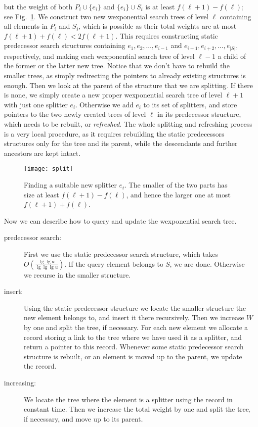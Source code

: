 \documentclass[11pt,onecolumn,final]{article} \usepackage{a4}
\theoremstyle{plain}
\theoremstyle{remark}
\begin{document}
but the weight of both $P_{i}\cup\{e_{i}\}$ and $\{e_{i}\}\cup S_{i}$ is at least $f(\ell+1)-f(\ell)$; see Fig.~\ref{fig:split}. We construct two new wexponential search trees of level $\ell$ containing all elements in $P_{i}$ and $S_{i}$, which is possible as their total weights are at most $f(\ell+1)+f(\ell)<2f(\ell+1)$. This requires constructing static predecessor search structures containing $e_{1},e_{2},\ldots,e_{i-1}$ and $e_{i+1},e_{i+2},\ldots,e_{|S|}$, respectively, and making each wexponential search tree of level $\ell-1$ a child of the former or the latter new tree. Notice that we don't have to rebuild the smaller trees, as simply redirecting the pointers to already existing structures is enough. Then we look at the parent of the structure that we are splitting. If there is none, we simply create a new proper wexponential search tree of level $\ell+1$ with just one splitter $e_{i}$. Otherwise we add $e_{i}$ to its set of splitters, and store pointers to the two newly created trees of level $\ell$ in its predecessor structure, which needs to be rebuilt, or \emph{refreshed}. The whole splitting and refreshing process is a very local procedure, as it requires rebuilding the static predecessors structures only for the tree and its parent, while the descendants and further ancestors are kept intact.

\begin{figure}
\centering
\texttt{[image: split]}
\caption{Finding a suitable new splitter $e_{i}$. The smaller of the two parts has size at least $f(\ell+1)-f(\ell)$, and hence the larger one at most $f(\ell+1)+f(\ell)$.}
\label{fig:split}
\end{figure}

Now we can describe how to query and update the wexponential search tree.
\begin{description}\item[predecessor search:] First we use the static predecessor search structure, which takes $O(\frac{\lg\lg u}{\lg\lg\lg u})$. If the query element belongs to $S$, we are done. Otherwise we recurse in the smaller structure.

\item[insert:] Using the static predecessor structure we locate the smaller structure the new element belongs to, and insert it there recursively. Then we increase $W$ by one and split the tree, if necessary. For each new element we allocate a record storing a link to the tree where we have used it as a splitter, and return a pointer to this record. Whenever some static predecessor search structure is rebuilt, or an element is moved up to the parent, we update the record.

\item[increasing:] We locate the tree where the element is a splitter using the record in constant time. Then we increase the total weight by one and split the tree, if necessary, and move up to its parent.
\end{description}
\end{document}
